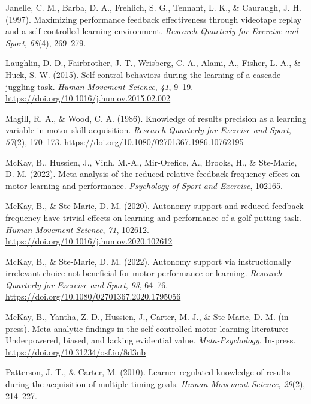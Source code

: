 \documentclass[final]{article}
\newlength{\cslhangindent}
\newenvironment{CSLReferences}[2] %
 {%
  \setlength{\parindent}{0pt}
  \ifodd #1 \everypar{\setlength{\hangindent}{\cslhangindent}}\ignorespaces\fi
  \ifnum #2 > 0
  \setlength{\parskip}{#2\baselineskip}
  \fi
 }%
 {}
\begin{document}
\begin{CSLReferences}{1}{0}
\leavevmode{}%
Janelle, C. M., Barba, D. A., Frehlich, S. G., Tennant, L. K., \& Cauraugh, J. H. (1997). Maximizing performance feedback effectiveness through videotape replay and a self-controlled learning environment. \emph{Research Quarterly for Exercise and Sport}, \emph{68}(4), 269--279.

\leavevmode{}%
Laughlin, D. D., Fairbrother, J. T., Wrisberg, C. A., Alami, A., Fisher, L. A., \& Huck, S. W. (2015). Self-control behaviors during the learning of a cascade juggling task. \emph{Human Movement Science}, \emph{41}, 9--19. \url{https://doi.org/10.1016/j.humov.2015.02.002}

\leavevmode{}%
Magill, R. A., \& Wood, C. A. (1986). Knowledge of results precision as a learning variable in motor skill acquisition. \emph{Research Quarterly for Exercise and Sport}, \emph{57}(2), 170--173. \url{https://doi.org/10.1080/02701367.1986.10762195}

\leavevmode{}%
McKay, B., Hussien, J., Vinh, M.-A., Mir-Orefice, A., Brooks, H., \& Ste-Marie, D. M. (2022). Meta-analysis of the reduced relative feedback frequency effect on motor learning and performance. \emph{Psychology of Sport and Exercise}, 102165.

\leavevmode{}%
McKay, B., \& Ste-Marie, D. M. (2020). Autonomy support and reduced feedback frequency have trivial effects on learning and performance of a golf putting task. \emph{Human Movement Science}, \emph{71}, 102612. \url{https://doi.org/10.1016/j.humov.2020.102612}

\leavevmode{}%
McKay, B., \& Ste-Marie, D. M. (2022). Autonomy support via instructionally irrelevant choice not beneficial for motor performance or learning. \emph{Research Quarterly for Exercise and Sport}, \emph{93}, 64--76. \url{https://doi.org/10.1080/02701367.2020.1795056}

\leavevmode{}%
McKay, B., Yantha, Z. D., Hussien, J., Carter, M. J., \& Ste-Marie, D. M. (in-press). Meta-analytic findings in the self-controlled motor learning literature: {Underpowered}, biased, and lacking evidential value. \emph{Meta-Psychology}. In-press. \url{https://doi.org/10.31234/osf.io/8d3nb}

\leavevmode{}%
Patterson, J. T., \& Carter, M. (2010). Learner regulated knowledge of results during the acquisition of multiple timing goals. \emph{Human Movement Science}, \emph{29}(2), 214--227.


\end{CSLReferences}
\end{document}
